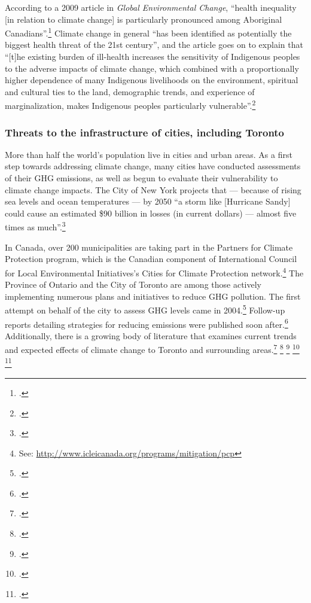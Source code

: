 \documentclass[10pt]{article}
\begin{document}
According to a 2009 article in \emph{Global Environmental Change}, ``health inequality [in relation to climate change] is
particularly pronounced among Aboriginal Canadians''.\footcite[][p. 1]{VulAborig2009}
Climate change in general ``has been identified as potentially the biggest health threat of the 21st century'', and the article goes on to explain that ``[t]he existing burden of ill-health increases the sensitivity of Indigenous peoples to the adverse impacts of climate change, which combined with a proportionally higher dependence of many Indigenous livelihoods on the environment, spiritual and cultural ties to the land, demographic trends, and experience of marginalization, makes Indigenous peoples particularly vulnerable''.\footcite[][p. 1]{VulAborig2009}



	\subsubsection{Threats to the infrastructure of cities, including Toronto}



More than half the world's population live in cities and urban areas. 
As a first step towards addressing climate change, many cities have conducted assessments of their GHG emissions, as well as begun to evaluate their vulnerability to climate change impacts.
The City of New York projects that --- because of rising sea levels and ocean temperatures --- by 2050 ``a storm like [Hurricane Sandy] could cause an estimated \$90 billion in losses (in current dollars) --- almost five times as much''.\footcite[][Foreward, p. 2]{ResilientNewYork}



In Canada, over 200 municipalities are taking part in the Partners for Climate Protection  program, which is the Canadian component of International Council for Local Environmental Initiatives's Cities for Climate Protection network.\footnote{See: \url{http://www.icleicanada.org/programs/mitigation/pcp}}
The Province of Ontario and the City of Toronto are among those actively implementing numerous plans and initiatives to reduce GHG pollution. 
The first attempt on behalf of the city to assess GHG levels came in 2004.\footcite[][p. IV]{GHGPollutionToronto}
Follow-up reports detailing strategies for reducing emissions were published soon after.\footcite[][]{CCAHealthEquity}
Additionally, there is a growing body of literature that examines current trends and expected effects of climate change to Toronto and surrounding areas.\footcite[][]{TorontoEnvOff2007} \footcite[][]{TorontoAheadStorm} \footcite[][]{ScanCCToronto} \footcite[][]{AdaptPrioritiesCanada} \footcite[][]{MacLeodAdaptation}
\end{document}
